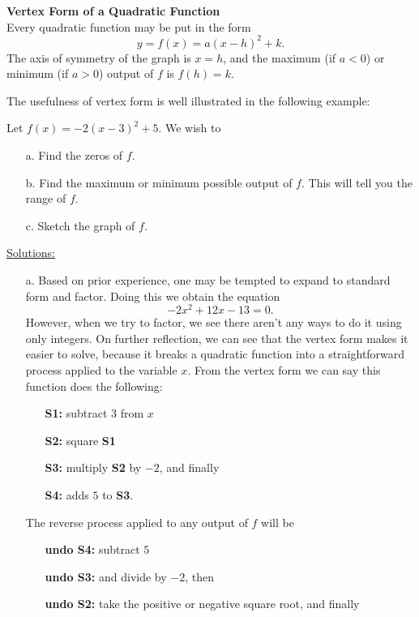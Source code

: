 \vspace{.25in}

\begin{tcolorbox}
{\bf Vertex Form of a Quadratic Function}\\
Every quadratic function may be put in the form
\[
y = f(x) = a(x-h)^2+k.
\]
The axis of symmetry of the graph is $x=h$, and the maximum (if $a<0$) or minimum (if $a>0$) output of $f$ is $f(h) = k$. 
\end{tcolorbox} 

The usefulness of vertex form is well illustrated in the following example:

\par

\begin{eg} Let $f(x) = -2(x-3)^2 + 5$. We wish to
\begin{enumerate}
\item[a.] Find the zeros of $f$.
\item[b.] Find the maximum or minimum possible output of $f$. This will tell you the range of $f$.
\item[c.] Sketch the graph of $f$. 
\end{enumerate}
\underline{Solutions:} \normalfont
\begin{enumerate}
\item[a.] Based on prior experience, one may be tempted to expand to standard form and factor. Doing this we obtain the equation
\[
-2x^2+12x-13 = 0.
\]
However, when we try to factor, we see there aren't any ways to do it using only integers. On further reflection, we can see that the vertex form makes it easier to solve, because it breaks a quadratic function into a straightforward process applied to the variable $x$. From the vertex form we can say this function does the following:
\begin{itemize}
\item[\bf S1:] subtract $3$ from $x$
\item[\bf S2:] square {\bf S1}
\item[\bf S3:]  multiply {\bf S2} by  $-2$, and finally
\item[\bf S4:] adds $5$ to {\bf S3}.  
\end{itemize}
The reverse process applied to any output of $f$ will be
\begin{itemize}
\item[\bf undo S4:] subtract $5$ 
\item[\bf undo S3:]and divide by $-2$, then
\item[\bf undo S2:] take the positive or negative square root, and finally

\end{itemize}
\end{enumerate}
\end{eg}

